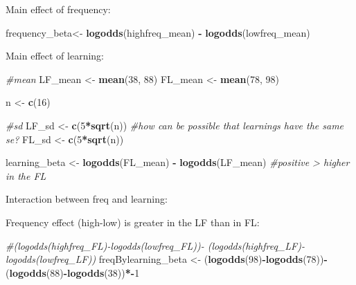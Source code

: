 \documentclass[
]{article}
\newenvironment{Shaded}{\begin{snugshade}}{\end{snugshade}}
\newcommand{\CommentTok}[1]{\textcolor[rgb]{0.56,0.35,0.01}{\textit{#1}}}
\newcommand{\DecValTok}[1]{\textcolor[rgb]{0.00,0.00,0.81}{#1}}
\newcommand{\KeywordTok}[1]{\textcolor[rgb]{0.13,0.29,0.53}{\textbf{#1}}}
\newcommand{\NormalTok}[1]{#1}
\newcommand{\OperatorTok}[1]{\textcolor[rgb]{0.81,0.36,0.00}{\textbf{#1}}}
\newcommand{\StringTok}[1]{\textcolor[rgb]{0.31,0.60,0.02}{#1}}
\begin{document}
Main effect of frequency:

\begin{Shaded}
\begin{Highlighting}[]
\NormalTok{frequency_beta<-}\StringTok{ }\KeywordTok{logodds}\NormalTok{(highfreq_mean) }\OperatorTok{-}\StringTok{ }\KeywordTok{logodds}\NormalTok{(lowfreq_mean)}
\end{Highlighting}
\end{Shaded}

Main effect of learning:

\begin{Shaded}
\begin{Highlighting}[]
\CommentTok{#mean}
\NormalTok{LF_mean <-}\StringTok{ }\KeywordTok{mean}\NormalTok{(}\DecValTok{38}\NormalTok{, }\DecValTok{88}\NormalTok{)}
\NormalTok{FL_mean <-}\StringTok{ }\KeywordTok{mean}\NormalTok{(}\DecValTok{78}\NormalTok{, }\DecValTok{98}\NormalTok{)}

\NormalTok{n <-}\StringTok{ }\KeywordTok{c}\NormalTok{(}\DecValTok{16}\NormalTok{)}

\CommentTok{#sd}
\NormalTok{LF_sd <-}\StringTok{ }\KeywordTok{c}\NormalTok{(}\DecValTok{5}\OperatorTok{*}\KeywordTok{sqrt}\NormalTok{(n)) }\CommentTok{#how can be possible that learnings have the same se?}
\NormalTok{FL_sd <-}\StringTok{ }\KeywordTok{c}\NormalTok{(}\DecValTok{5}\OperatorTok{*}\KeywordTok{sqrt}\NormalTok{(n))}
\end{Highlighting}
\end{Shaded}

\begin{Shaded}
\begin{Highlighting}[]
\NormalTok{learning_beta <-}\StringTok{ }\KeywordTok{logodds}\NormalTok{(FL_mean) }\OperatorTok{-}\StringTok{ }\KeywordTok{logodds}\NormalTok{(LF_mean)}
\CommentTok{#positive > higher in the FL}
\end{Highlighting}
\end{Shaded}

Interaction between freq and learning:

Frequency effect (high-low) is greater in the LF than in FL:

\begin{Shaded}
\begin{Highlighting}[]
\CommentTok{#(logodds(highfreq_FL)-logodds(lowfreq_FL))- (logodds(highfreq_LF)-logodds(lowfreq_LF))}
\NormalTok{freqBylearning_beta <-}\StringTok{ }\NormalTok{(}\KeywordTok{logodds}\NormalTok{(}\DecValTok{98}\NormalTok{)}\OperatorTok{-}\KeywordTok{logodds}\NormalTok{(}\DecValTok{78}\NormalTok{))}\OperatorTok{-}\StringTok{ }\NormalTok{(}\KeywordTok{logodds}\NormalTok{(}\DecValTok{88}\NormalTok{)}\OperatorTok{-}\KeywordTok{logodds}\NormalTok{(}\DecValTok{38}\NormalTok{))}\OperatorTok{*-}\DecValTok{1}
\end{Highlighting}
\end{Shaded}
\end{document}
